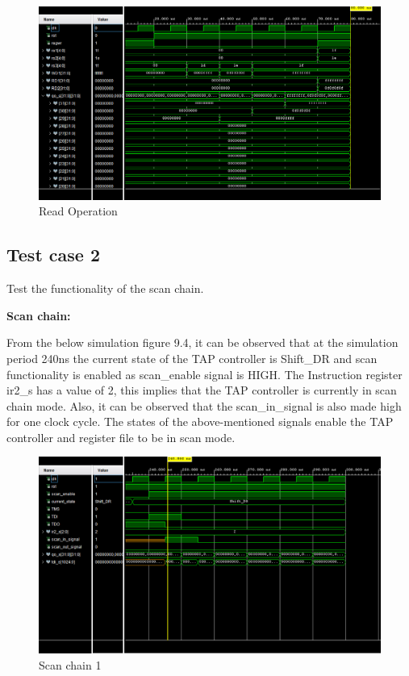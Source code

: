  \begin{figure}[h]
    \centering
    \includegraphics[width=0.8\linewidth]{Image/RO2.png}
    \caption{Read Operation}
    \label{fig:enter-label}
\end{figure}
\subsection{Test case 2}

Test the functionality of the scan chain.
\vspace{2mm}

\textbf{Scan chain:}
\vspace{2mm}

From the below simulation figure 9.4, it can be observed that at the simulation period 240ns the current state of the TAP controller is Shift\_DR and scan functionality is enabled as scan\_enable signal is HIGH. The Instruction register ir2\_s has a value of 2, this implies that the TAP controller is currently in scan chain mode. Also, it can be observed that the scan\_in\_signal is also made high for one clock cycle. The states of the above-mentioned signals enable the TAP controller and register file to be in scan mode.

\newpage

\begin{figure}[h]
    \centering
    \includegraphics[width=0.8\linewidth]{Image/WO3.png}
    \caption{Scan chain 1}
    \label{Scan chain 1}
\end{figure}

